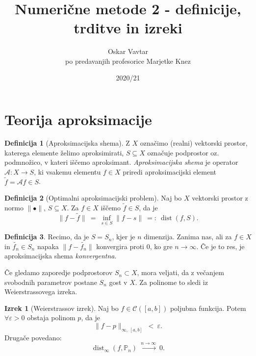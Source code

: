 \documentclass[11pt]{article}
\title{Numerične metode 2 - definicije, trditve in izreki}
\author{Oskar Vavtar \\
po predavanjih profesorice Marjetke Knez}
\date{2020/21}
\DeclareMathOperator{\dist}{dist}
\newcommand{\p}{\mathbb{P}}
\newcommand{\A}{\mathcal{A}}
\newcommand{\C}{\mathcal{C}}
\theoremstyle{definition}
\newtheorem{definicija}{Definicija}[section]
\theoremstyle{definition}
\newtheorem{izrek}{Izrek}[section]
\begin{document}
\maketitle
\pagebreak
\tableofcontents
\pagebreak


\section{Teorija aproksimacije}
\vspace{0.5cm}

\begin{definicija}[Aproksimacijska shema]

Z $X$ označimo (realni) vektorski prostor, katerega elemente želimo aproksimirati, $S \subseteq X$ označuje podprostor oz. podmnožico, v kateri iščemo aproksimant. \textit{Aproksimacijska shema} je operator $\A: X \rightarrow S$, ki vsakemu elementu $f \in X$ priredi aproksimacijski element $\tilde{f} = \A f \in S$.

\end{definicija}
\vspace{0.5cm}

\begin{definicija}[Optimalni aproksimacijski problem]

Naj bo $X$ vektorski prostor z normo $\|\bullet\|$, $S \subseteq X$. Za $f \in X$ iščemo $\tilde{f} \in S$, da je 
$$\|f - \tilde{f}\| ~=~ \inf_{s \in S}{\|f - s\|} ~=:~ \dist(f, S).$$

\end{definicija}
\vspace{0.5cm}

\begin{definicija}

Recimo, da je $S = S_n$, kjer je $n$ dimenzija. Zanima nas, ali za $f \in X$ in $\tilde{f_n} \in S_n$ napaka $\|f - \tilde{f_n}\|$ konvergira proti $0$, ko gre $n \rightarrow \infty$. Če je to res, je aproksimacijska shema \textit{konvergentna}.

Če gledamo zaporedje podprostorov $S_n \subset X$, mora veljati, da z večanjem svobodnih parametrov postane $S_n$ gost v $X$. Za polinome to sledi iz Weierstrassovega izreka.

\end{definicija}
\vspace{0.5cm}

\begin{izrek}[Weierstrassov izrek]

Naj bo $f \in \C([a, b])$ poljubna funkcija. Potem $\forall \varepsilon > 0$ obstaja polinom $p$, da je 
$$\|f - p\|_{\infty,~[a, b]} ~<~ \varepsilon.$$
Drugače povedano:
$$\dist_{\infty}(f, \p_n) ~\xrightarrow{n \rightarrow \infty}~ 0.$$

\end{izrek}
\vspace{0.5cm}
\end{document}

